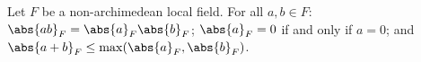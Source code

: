 Let $F$ be a non-archimedean local field. For all $a,b\in F$:
$\abs{ab}_F=\abs{a}_F\abs{b}_F$; $\abs{a}_F=0$ if and only if $a=0$; and $\abs{a+b}_F\le\max(\abs{a}_F,\abs{b}_F)$.
